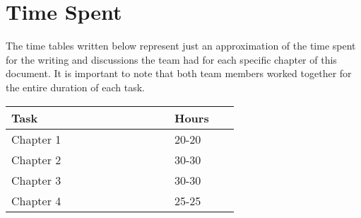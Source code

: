 \section{Time Spent}
The time tables written below represent just an approximation of the time spent for the writing and discussions the team had for each specific chapter of this document.
It is important to note that both team members worked together for the entire duration of each task.
\vspace{10mm}
\vspace{1mm}
\begin{center}
    \begin{tabular}{@{}p{0.5\linewidth} p{0.2\linewidth}@{}}
        \hline
        \textbf{Task} & \textbf{Hours} \\ \hline
        Chapter 1& 20-20 \\ \hline
        Chapter 2 & 30-30 \\ \hline
        Chapter 3 & 30-30 \\ \hline
        Chapter 4 & 25-25 \\ \hline
    \end{tabular}
\end{center}

